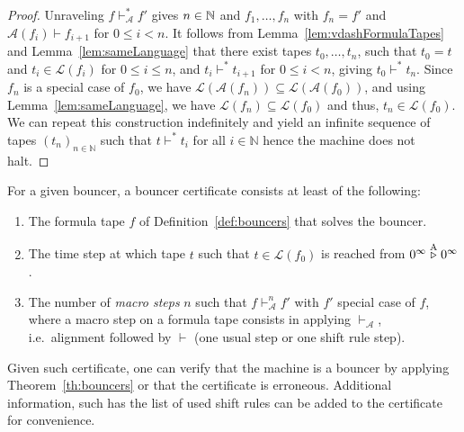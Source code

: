 \begin{proof}
    Unraveling $f \vdash_\mathcal{A}^* f'$ gives $n\in\mathbb{N}$ and $f_1, \dots, f_n$ with $f_n = f'$ and $\mathcal{A}(f_i) \vdash f_{i+1}$ for $0 \leq i < n$.
    It follows from Lemma~\ref{lem:vdashFormulaTapes} and Lemma~\ref{lem:sameLanguage} that there exist tapes $t_0, \dots, t_n$, such that $t_0 = t$ and $t_i\in \mathcal{L}(f_i)$ for $0 \leq i \leq n$, and $t_i \vdash^* t_{i+1}$ for $0 \leq i < n$, giving $t_0 \vdash^* t_n$. Since $f_n$ is a special case of $f_0$, we have $\mathcal{L}(\mathcal{A}(f_n)) \subseteq \mathcal{L}(\mathcal{A}(f_0))$, and using Lemma~\ref{lem:sameLanguage}, we have $\mathcal{L}(f_n) \subseteq \mathcal{L}(f_0)$ and thus, $t_n \in \mathcal{L}(f_0)$. We can repeat this construction indefinitely and yield an infinite sequence of tapes $(t_n)_{n\in\mathbb{N}}$ such that $t \vdash^* t_i$ for all $i\in\mathbb{N}$ hence the machine does not halt.
\end{proof}



\begin{definition}\label{def:bouncer-certificate}
    For a given bouncer, a bouncer certificate consists at least of the following:
    \begin{enumerate}
        \item The formula tape $f$ of Definition~\ref{def:bouncers} that solves the bouncer.
        \item The time step at which tape $t$ such that $t\in\mathcal{L}(f_0)$ is reached from  $0^\infty \stackrel{\text{A}}\triangleright 0^\infty$.
        \item The number of \textit{macro steps} $n$ such that $f \vdash_\mathcal{A}^n f'$ with $f'$ special case of $f$, where a macro step on a formula tape consists in applying $\vdash_\mathcal{A}$, i.e.\ alignment followed by $\vdash$ (one usual step or one shift rule step).
    \end{enumerate}
    Given such certificate, one can verify that the machine is a bouncer by applying Theorem~\ref{th:bouncers} or that the certificate is erroneous. Additional information, such has the list of used shift rules can be added to the certificate for convenience.
\end{definition}

